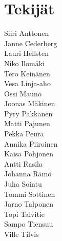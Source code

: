 \chapter{Tekijät}

Siiri Anttonen \\
Janne Cederberg \\
Lauri Hellsten\\
Niko Ilomäki\\
Tero Keinänen\\
Vesa Linja-aho\\
Ossi Mauno\\
Joonas Mäkinen\\
Pyry Pakkanen\\
Matti Pajunen\\
Pekka Peura\\
Annika Piiroinen\\
Kaisa Pohjonen\\
Antti Rasila\\
Johanna Rämö\\
Juha Sointu\\
Tommi Sottinen\\
Jarno Talponen\\
Topi Talvitie\\
Sampo Tiensuu\\
Ville Tilvis

